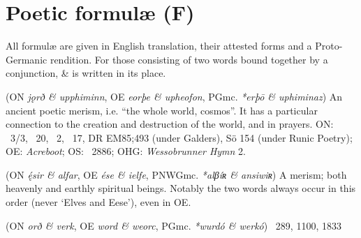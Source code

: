 \section{Poetic formulæ (F)}
All formulæ are given in English translation, their attested forms and a Proto-Germanic rendition. For those consisting of two words bound together by a conjunction, \& is written in its place.

\begin{itemize}
 (ON \emph{jǫrð \& upphiminn}, OE \emph{eorþe \& upheofon}, PGmc. \emph{*erþō \& uphiminaz})
  An ancient poetic merism, i.e. “the whole world, cosmos”. It has a particular connection to the creation and destruction of the world, and in prayers.
  ON: \Voluspa\ 3/3, \Vafthrudnismal\ 20, \Thrymskvida\ 2, \Oddrunargratr\ 17, DR EM85;493 (under Galders), Sö 154 (under Runic Poetry);
  OE: \emph{Acreboot};
  OS: \Heliand\ 2886;
  OHG: \emph{Wessobrunner Hymn} 2.

 (ON \emph{ę́sir \& alfar}, OE \emph{ése \& ielfe}, PNWGmc. \emph{*alβíʀ \& ansiwiʀ})
  A merism; both heavenly and earthly spiritual beings.  Notably the two words always occur in this order (never ‘Elves and Eese’), even in OE.

 (ON \emph{orð \& verk}, OE \emph{word \& weorc}, PGmc. \emph{*wurdó \& werkó})
  \Beowulf\ 289, 1100, 1833

\end{itemize}
